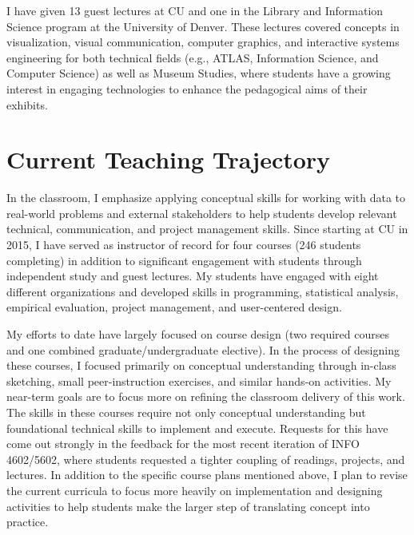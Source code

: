 \documentclass[11pt]{article}
\begin{document}


I have given 13 guest lectures at CU and one in the Library and Information Science program at the University of Denver. These lectures covered concepts in visualization, visual communication, computer graphics, and interactive systems engineering for both technical fields (e.g., ATLAS, Information Science, and Computer Science) as well as Museum Studies, where students have a growing interest in engaging technologies to enhance the pedagogical aims of their exhibits. 


\section*{Current Teaching Trajectory}

In the classroom, I emphasize applying conceptual skills for working with data to real-world problems and external stakeholders to help students develop relevant technical, communication, and project management skills. Since starting at CU in 2015, I have served as instructor of record for four courses (246 students completing) in addition to significant engagement with students through independent study and guest lectures. My students have engaged with eight different organizations and developed skills in programming, statistical analysis, empirical evaluation, project management, and user-centered design.

My efforts to date have largely focused on course design (two required courses and one combined graduate/undergraduate elective). In the process of designing these courses, I focused primarily on conceptual understanding through in-class sketching, small peer-instruction exercises, and similar hands-on activities. My near-term goals are to focus more on refining the classroom delivery of this work. The skills in these courses require not only conceptual understanding but foundational technical skills to implement and execute. Requests for this have come out strongly in the feedback for the most recent iteration of INFO 4602/5602, where students requested a tighter coupling of readings, projects, and lectures. In addition to the specific course plans mentioned above, I plan to revise the current curricula to focus more heavily on implementation and designing activities to help students make the larger step of translating concept into practice. 


\pagebreak
\setcounter{page}{1}
\end{document}
